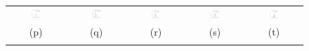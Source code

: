 \begin{figure}[t]
\begin{tabular}{@{}c c c c c@{}}
\includegraphics[width=0.18\textwidth]{figs/synthetic/syn_lines_gabor_responses_cdf_0} &
\includegraphics[width=0.18\textwidth]{figs/synthetic/syn_lines_gabor_responses_cdf_1} &
\includegraphics[width=0.18\textwidth]{figs/synthetic/syn_lines_gabor_responses_cdf_2} &
\includegraphics[width=0.18\textwidth]{figs/synthetic/syn_lines_gabor_responses_cdf_3} &
\includegraphics[width=0.18\textwidth]{figs/retina/ret_vessels_gabor_responses_cdf} \\
(p) & (q) & (r) & (s) & (t)\\
\noalign{\smallskip}


\end{tabular}
\end{figure}
